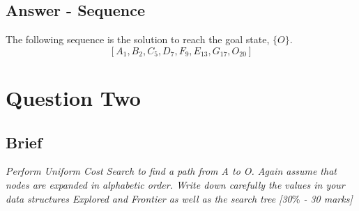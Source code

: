 \documentclass{article}
\begin{document}
\subsection{Answer - Sequence}
The following sequence is the solution to reach the goal state, $\{O\}$.
$$[A_{1}, B_{2}, C_{5}, D_{7}, F_{9}, E_{13}, G_{17}, O_{20}]$$

\newpage
\section{Question Two}
\subsection{Brief}
\flushleft\textit{Perform Uniform Cost Search to find a path from A to O. Again assume that nodes are expanded in alphabetic order. Write down carefully the values in your data structures Explored and Frontier as well as the search tree [30$\%$ - 30 marks]}
\end{document}
